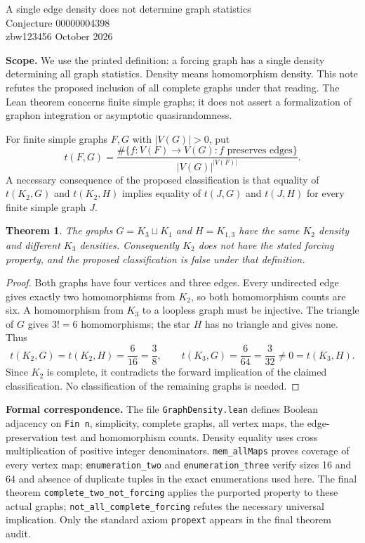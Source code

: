 \documentclass[11pt]{article}
\newtheorem{theorem}{Theorem}
\begin{document}
\begin{center}
{\Large A single edge density does not determine graph statistics}\\[5pt]
{\large Conjecture 00000004398}\\[5pt]
zbw123456  October 2026
\end{center}
\textbf{Scope.} We use the printed definition: a forcing graph has a single
density determining all graph statistics. Density means homomorphism density.
This note refutes the proposed inclusion of all complete graphs under that
reading. The Lean theorem concerns finite simple graphs; it does not assert a
formalization of graphon integration or asymptotic quasirandomness.

For finite simple graphs $F,G$ with $|V(G)|>0$, put
\[
 t(F,G)=\frac{\#\{f:V(F)\to V(G): f\text{ preserves edges}\}}
 {|V(G)|^{|V(F)|}}.
\]
A necessary consequence of the proposed classification is that equality of
$t(K_2,G)$ and $t(K_2,H)$ implies equality of $t(J,G)$ and $t(J,H)$ for every
finite simple graph $J$.

\begin{theorem}
The graphs $G=K_3\sqcup K_1$ and $H=K_{1,3}$ have the same $K_2$ density
and different $K_3$ densities. Consequently $K_2$ does not have the stated
forcing property, and the proposed classification is false under that definition.
\end{theorem}
\begin{proof}
Both graphs have four vertices and three edges. Every undirected edge gives
exactly two homomorphisms from $K_2$, so both homomorphism counts are six.
A homomorphism from $K_3$ to a loopless graph must be injective. The triangle
of $G$ gives $3!=6$ homomorphisms; the star $H$ has no triangle and gives none.
Thus
\[
 t(K_2,G)=t(K_2,H)=\frac6{16}=\frac38,
 \qquad t(K_3,G)=\frac6{64}=\frac3{32}\ne0=t(K_3,H).
\]
Since $K_2$ is complete, it contradicts the forward implication of the
claimed classification. No classification of the remaining graphs is needed.
\end{proof}

\textbf{Formal correspondence.} The file \texttt{GraphDensity.lean} defines
Boolean adjacency on \texttt{Fin n}, simplicity, complete graphs, all vertex
maps, the edge-preservation test and homomorphism counts. Density equality
uses cross multiplication of positive integer denominators.
\texttt{mem\_allMaps} proves coverage of every vertex map;
\texttt{enumeration\_two} and \texttt{enumeration\_three} verify sizes 16 and 64
and absence of duplicate tuples in the exact enumerations used here.
The final theorem \texttt{complete\_two\_not\_forcing} applies the purported
property to these actual graphs; \texttt{not\_all\_complete\_forcing} refutes
the necessary universal implication. Only the standard axiom \texttt{propext}
appears in the final theorem audit.
\end{document}
